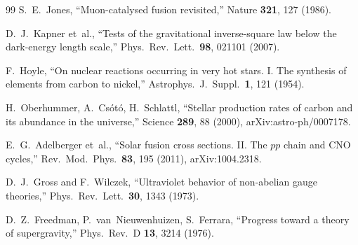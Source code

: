 \documentclass[12pt,a4paper]{article}
\begin{document}
\begin{thebibliography}{99}
S.~E.~Jones, ``Muon-catalysed fusion revisited,''
Nature \textbf{321}, 127 (1986).

D.~J.~Kapner et~al., ``Tests of the gravitational inverse-square law
below the dark-energy length scale,''
Phys.\ Rev.\ Lett.\ \textbf{98}, 021101 (2007).

F.~Hoyle, ``On nuclear reactions occurring in very hot stars.
I. The synthesis of elements from carbon to nickel,''
Astrophys.\ J.\ Suppl.\ \textbf{1}, 121 (1954).

H.~Oberhummer, A.~Cs\'ot\'o, H.~Schlattl,
``Stellar production rates of carbon and its abundance in the
universe,'' Science \textbf{289}, 88 (2000),
arXiv:astro-ph/0007178.

E.~G.~Adelberger et~al., ``Solar fusion cross sections.
II. The $pp$ chain and CNO cycles,''
Rev.\ Mod.\ Phys.\ \textbf{83}, 195 (2011),
arXiv:1004.2318.

D.~J.~Gross and F.~Wilczek, ``Ultraviolet behavior of non-abelian
gauge theories,'' Phys.\ Rev.\ Lett.\ \textbf{30}, 1343 (1973).

D.~Z.~Freedman, P.~van~Nieuwenhuizen, S.~Ferrara,
``Progress toward a theory of supergravity,''
Phys.\ Rev.\ D \textbf{13}, 3214 (1976).

\end{thebibliography}

\tableofcontents
\end{document}
